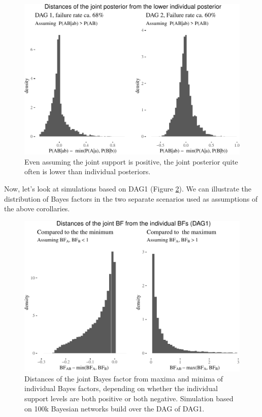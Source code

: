 \documentclass[
  10pt,
  dvipsnames,enabledeprecatedfontcommands]{scrartcl}
\begin{document}
\begin{figure}[H]


\begin{center}\includegraphics[width=1\linewidth]{conjunction-appendix13_files/figure-latex/unnamed-chunk-11-1} \end{center}
\caption{Even assuming the joint support is positive, the joint posterior quite often is lower than individual posteriors.}
\label{fig:posteriorFailure}
\end{figure}

Now, let's look at simulations based on \textsf{DAG1} (Figure
\ref{fig:DAG1BF}). We can illustrate the distribution of Bayes factors
in the two separate scenarios used as assumptions of the above
corollaries.

\vspace{1mm}
\footnotesize

\normalsize

\begin{figure}

\begin{center}\includegraphics[width=1\linewidth]{conjunction-appendix13_files/figure-latex/BFind-1} \end{center}
\caption{Distances of the joint Bayes factor from maxima and minima of individual Bayes factors, depending on whether the individual support levels are both positive or both negative. Simulation based on 100k Bayesian networks build over the DAG of \textsf{DAG1}.}
\label{fig:DAG1BF}
\end{figure}
\end{document}
